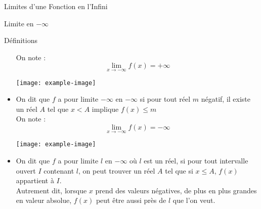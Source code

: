 \documentclass{cours}
\begin{document}
\begin{Gpartie}{Limites d'une Fonction en l'Infini}
\begin{Spartie}{Limite en $-\infty$}
\begin{SSpartie}{Définitions}
\begin{itemize}
                    On note : \[\lim\limits_{x\to-\infty}f(x)=+\infty\]
                    \begin{center}
                            \texttt{[image: example-image]}
                        \parbox{\linewidth}{}
                    \end{center}
                    \vspace*{2ex}
                    \item   On dit que $f$ a pour limite $-\infty$ en $-\infty$ si pour tout réel $m$ négatif, il existe un réel $A$ tel que $x<A$ implique $f(x)\leq m$ \\ On note : \[\lim\limits_{x\to-\infty}f(x)=-\infty\]
                    \begin{center}
                            \texttt{[image: example-image]}
                        \parbox{\linewidth}{}
                    \end{center}
                    \pagebreak
                    \item   On dit que $f$ a pour limite $l$ en $-\infty$ où $l$ est un réel, si pour tout intervalle ouvert $I$ contenant $l$, on peut trouver un réel $A$ tel que si $x\leq A$, $f(x)$ appartient à $I$. \\ Autrement dit, lorsque $x$ prend des valeurs négatives, de plus en plus grandes en valeur absolue, $f(x)$ peut être aussi près de $l$ que l'on veut.
                    

\end{itemize}
\end{SSpartie}
\end{Spartie}
\end{Gpartie}
\end{document}

